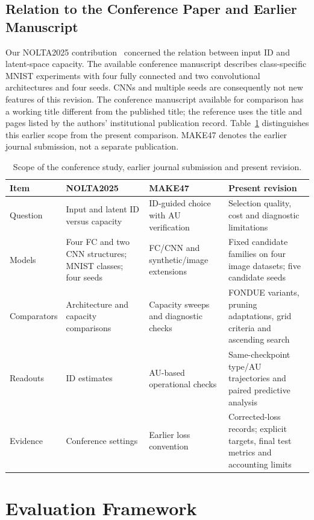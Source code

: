 \subsection{Relation to the Conference Paper and Earlier Manuscript}
Our NOLTA2025 contribution~\cite{obata2025manifold} concerned the relation
between input ID and latent-space capacity. The available conference
manuscript describes class-specific MNIST experiments with four fully
connected and two convolutional architectures and four seeds. CNNs and
multiple seeds are consequently not new features of this revision.
The conference manuscript available for comparison has a working title
different from the published title; the reference uses the title and
pages listed by the authors' institutional publication record.
Table~\ref{tab:history} distinguishes this earlier scope from the present
comparison. MAKE47 denotes the earlier journal submission, not a separate
publication.

\begin{table}[H]
\caption{Scope of the conference study, earlier journal submission and present revision.}
\label{tab:history}\small
\begin{tabularx}{\textwidth}{lXXX}\toprule
Item & NOLTA2025 & MAKE47 & Present revision \\\midrule
Question & Input and latent ID versus capacity & ID-guided choice with AU verification & Selection quality, cost and diagnostic limitations \\
Models & Four FC and two CNN structures; MNIST classes; four seeds & FC/CNN and synthetic/image extensions & Fixed candidate families on four image datasets; five candidate seeds \\
Comparators & Architecture and capacity comparisons & Capacity sweeps and diagnostic checks & FONDUE variants, pruning adaptations, grid criteria and ascending search \\
Readouts & ID estimates & AU-based operational checks & Same-checkpoint type/AU trajectories and paired predictive analysis \\
Evidence & Conference settings & Earlier loss convention & Corrected-loss records; explicit targets, final test metrics and accounting limits \\
\bottomrule\end{tabularx}
\end{table}

\section{Evaluation Framework}\label{sec:framework}

